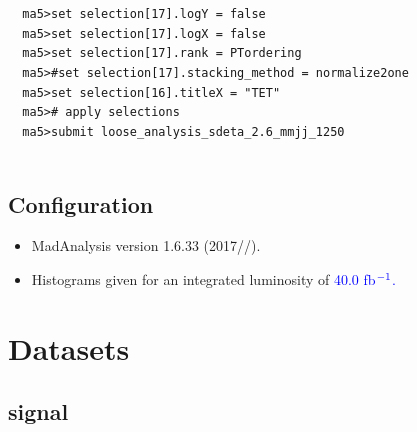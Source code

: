 \documentclass[a4paper, 10pt]{article}
\begin{document}
\texttt{ }\texttt{ }\texttt{ma5>set selection[17].logY = false\\
}
\texttt{ }\texttt{ }\texttt{ma5>set selection[17].logX = false\\
}
\texttt{ }\texttt{ }\texttt{ma5>set selection[17].rank = PTordering\\
}
\texttt{ }\texttt{ }\texttt{ma5>\#set selection[17].stacking\_method = normalize2one\\
}
\texttt{ }\texttt{ }\texttt{ma5>set selection[16].titleX = "TET"\\
}
\texttt{ }\texttt{ }\texttt{ma5>\# apply selections\\
}
\texttt{ }\texttt{ }\texttt{ma5>submit loose\_analysis\_sdeta\_2.6\_mmjj\_1250\\
}
\texttt{ }\texttt{ }\subsection{ Configuration}

\begin{itemize}
  \item MadAnalysis version 1.6.33 (2017//).
   \item Histograms given for an integrated luminosity of \textcolor{blue}{40.0}\textcolor{blue}{ fb}$^{\textcolor{blue}{-1}}$\textcolor{blue}{.}
\textcolor{blue}{}
\end{itemize}
\newpage
\section{ Datasets}

\subsection{ signal}
\end{document}
